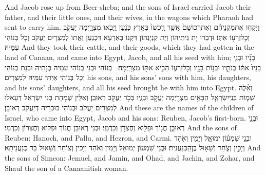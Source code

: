 {And Jacob rose up from Beer-sheba; and the sons of Israel carried Jacob their father, and their little ones, and their wives, in the wagons which Pharaoh had sent to carry him.}{}
{וַיִּקְח֣וּ אֶת\maqqaf מִקְנֵיהֶ֗ם וְאֶת\maqqaf רְכוּשָׁם֙ אֲשֶׁ֤ר רָֽכְשׁוּ֙ בְּאֶ֣רֶץ כְּנַ֔עַן וַיָּבֹ֖אוּ מִצְרָ֑יְמָה יַעֲקֹ֖ב וְכׇל\maqqaf זַרְע֥וֹ אִתּֽוֹ׃}
{וּדְבַרוּ יָת גֵּיתֵיהוֹן וְיָת קִנְיָנְהוֹן דִּקְנוֹ בְּאַרְעָא דִּכְנַעַן וַאֲתוֹ לְמִצְרָיִם יַעֲקֹב וְכָל בְּנוֹהִי עִמֵּיהּ׃}
{And they took their cattle, and their goods, which they had gotten in the land of Canaan, and came into Egypt, Jacob, and all his seed with him;}{}
{בָּנָ֞יו וּבְנֵ֤י בָנָיו֙ אִתּ֔וֹ בְּנֹתָ֛יו וּבְנ֥וֹת בָּנָ֖יו וְכׇל\maqqaf זַרְע֑וֹ הֵבִ֥יא אִתּ֖וֹ מִצְרָֽיְמָה׃ \setuma }
{בְּנוֹהִי וּבְנֵי בְנוֹהִי עִמֵּיהּ בְּנָתֵיהּ וּבְנָת בְּנוֹהִי וְכָל בְּנוֹהִי אַיְתִי עִמֵּיהּ לְמִצְרָיִם׃}
{his sons, and his sons’ sons with him, his daughters, and his sons’ daughters, and all his seed brought he with him into Egypt.}{}
{וְאֵ֨לֶּה שְׁמ֧וֹת בְּנֵֽי\maqqaf יִשְׂרָאֵ֛ל הַבָּאִ֥ים מִצְרַ֖יְמָה יַעֲקֹ֣ב וּבָנָ֑יו בְּכֹ֥ר יַעֲקֹ֖ב רְאוּבֵֽן׃}
{וְאִלֵּין שְׁמָהָת בְּנֵי יִשְׂרָאֵל דְּעָאלוּ לְמִצְרַיִם יַעֲקֹב וּבְנוֹהִי בּוּכְרֵיהּ דְּיַעֲקֹב רְאוּבֵן׃}
{And these are the names of the children of Israel, who came into Egypt, Jacob and his sons: Reuben, Jacob’s first-born.}{}
{וּבְנֵ֖י רְאוּבֵ֑ן חֲנ֥וֹךְ וּפַלּ֖וּא וְחֶצְרֹ֥ן וְכַרְמִֽי׃}
{וּבְנֵי רְאוּבֵן חֲנוֹךְ וּפַלּוּא וְחֶצְרוֹן וְכַרְמִי׃}
{And the sons of Reuben: Hanoch, and Pallu, and Hezron, and Carmi.}{}
{וּבְנֵ֣י שִׁמְע֗וֹן יְמוּאֵ֧ל וְיָמִ֛ין וְאֹ֖הַד וְיָכִ֣ין וְצֹ֑חַר וְשָׁא֖וּל בֶּן\maqqaf הַֽכְּנַעֲנִֽית׃}
{וּבְנֵי שִׁמְעוֹן יְמוּאֵל וְיָמִין וְאֹהַד וְיָכִין וְצוֹחַר וְשָׁאוּל בַּר כְּנַעֲנֵיתָא׃}
{And the sons of Simeon: Jemuel, and Jamin, and Ohad, and Jachin, and Zohar, and Shaul the son of a Canaanitish woman.}{}
